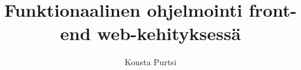 \documentclass[a4paper,12pt,language=finnish,version=draft,hidechapters=true,includereferences=false,realtimesnewroman=false,sharelatex=false,emptyfirstpages=true]{utuftthesis}
\begin{document}
\begin{comment}
Want to fix something in the template? Send a merge.\\
\\
Relies on utuftthesis.cls for the document class definitions.
\end{comment}





\title{Funktionaalinen ohjelmointi front-end web-kehityksessä}
\author{Konsta Purtsi}

\maketitle


\pagestyle{empty}

\tableofcontents



%
%
\begin{comment}
The thesis starts here.

To better organize things, create a new tex file for each chapter
and input it below.

Avoid using the å, ä, ö or <space> characters in referred names and
underscores \_ in file names (may break hyperref).

Good luck!
\end{comment}








%
%

\begin{comment}
The thesis main content ends here.
\end{comment}
\printbibliography

\begin{comment}
main document ends here
\end{comment}
\end{document}
